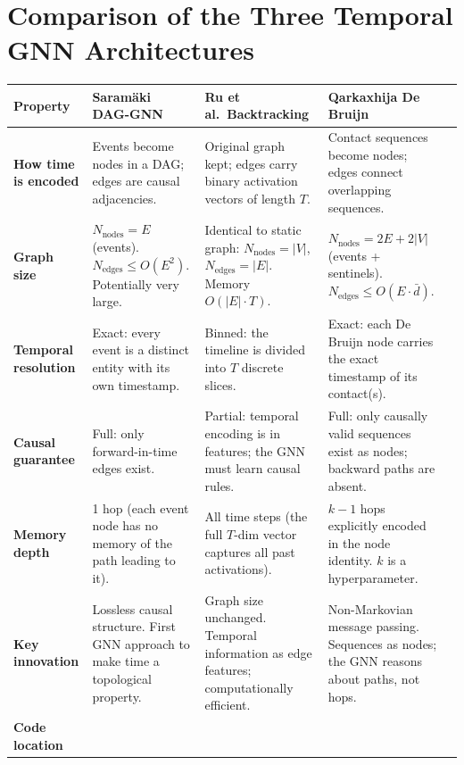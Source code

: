 \section{Comparison of the Three Temporal GNN Architectures}

\begin{table}[H]
\centering
\renewcommand{\arraystretch}{1.4}
\begin{tabular}{p{2.6cm} p{3.2cm} p{2.8cm} p{2.8cm} p{3.2cm}}
\toprule
\textbf{Property} &
\textbf{Saram{\"a}ki DAG-GNN} &
\textbf{Ru et al.\ Backtracking} &
\textbf{Qarkaxhija De Bruijn} \\
\midrule
\textbf{How time is encoded} &
Events become nodes in a DAG; edges are causal adjacencies. &
Original graph kept; edges carry binary activation vectors of length $T$. &
Contact sequences become nodes; edges connect overlapping sequences. \\
\midrule
\textbf{Graph size} &
$N_{\text{nodes}} = E$ (events). $N_{\text{edges}} \leq O(E^2)$. Potentially very large. &
Identical to static graph: $N_{\text{nodes}} = |V|$, $N_{\text{edges}} = |E|$. Memory $O(|E| \cdot T)$. &
$N_{\text{nodes}} = 2E + 2|V|$ (events + sentinels). $N_{\text{edges}} \leq O(E \cdot \bar{d})$. \\
\midrule
\textbf{Temporal resolution} &
Exact: every event is a distinct entity with its own timestamp. &
Binned: the timeline is divided into $T$ discrete slices. &
Exact: each De Bruijn node carries the exact timestamp of its contact(s). \\
\midrule
\textbf{Causal guarantee} &
Full: only forward-in-time edges exist. &
Partial: temporal encoding is in features; the GNN must learn causal rules. &
Full: only causally valid sequences exist as nodes; backward paths are absent. \\
\midrule
\textbf{Memory depth} &
1 hop (each event node has no memory of the path leading to it). &
All time steps (the full $T$-dim vector captures all past activations). &
$k-1$ hops explicitly encoded in the node identity. $k$ is a hyperparameter. \\
\midrule
\textbf{Key innovation} &
Lossless causal structure. First GNN approach to make time a topological property. &
Graph size unchanged. Temporal information as edge features; computationally efficient. &
Non-Markovian message passing. Sequences as nodes; the GNN reasons about paths, not hops. \\
\midrule
\textbf{Code location} &

\end{tabular}
\end{table}
